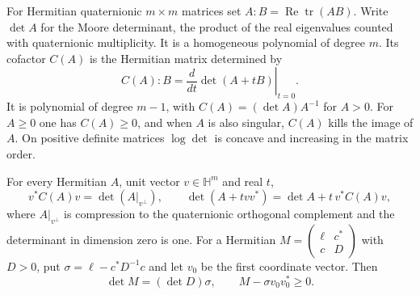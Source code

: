 For Hermitian quaternionic $m\times m$ matrices set $A:B=\operatorname{Re}\operatorname{tr}(AB)$. Write $\det A$ for the Moore determinant, the product of the real eigenvalues counted with quaternionic multiplicity. It is a homogeneous polynomial of degree $m$. Its cofactor $C(A)$ is the Hermitian matrix determined by
\[
C(A):B=\left.\frac{d}{dt}\det(A+tB)\right|_{t=0}.
\]
It is polynomial of degree $m-1$, with $C(A)=(\det A)A^{-1}$ for $A>0$. For $A\ge0$ one has $C(A)\ge0$, and when $A$ is also singular, $C(A)$ kills the image of $A$. On positive definite matrices $\log\det$ is concave and increasing in the matrix order.

For every Hermitian $A$, unit vector $v\in\mathbb H^m$ and real $t$,
\[
v^*C(A)v=\det(A|_{v^\perp}),\qquad
\det(A+tvv^*)=\det A+t\,v^*C(A)v,
\]
where $A|_{v^\perp}$ is compression to the quaternionic orthogonal complement and the determinant in dimension zero is one. For a Hermitian $M=\left(\begin{smallmatrix}\ell&c^*\\c&D\end{smallmatrix}\right)$ with $D>0$, put $\sigma=\ell-c^*D^{-1}c$ and let $v_0$ be the first coordinate vector. Then
\[
\det M=(\det D)\sigma,\qquad M-\sigma v_0v_0^*\ge0.
\]
